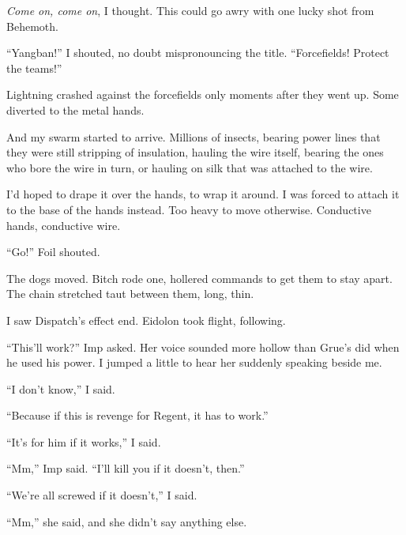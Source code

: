 \emph{Come on, come on}, I thought.  This could go awry with one lucky shot from Behemoth.



``Yangban!'' I shouted, no doubt mispronouncing the title.  ``Forcefields!  Protect the teams!''



Lightning crashed against the forcefields only moments after they went up.  Some diverted to the metal hands.



And my swarm started to arrive.  Millions of insects, bearing power lines that they were still stripping of insulation, hauling the wire itself, bearing the ones who bore the wire in turn, or hauling on silk that was attached to the wire.



I'd hoped to drape it over the hands, to wrap it around.  I was forced to attach it to the base of the hands instead.  Too heavy to move otherwise.  Conductive hands, conductive wire.



``Go!'' Foil shouted.



The dogs moved.  Bitch rode one, hollered commands to get them to stay apart.  The chain stretched taut between them, long, thin.



I saw Dispatch's effect end.  Eidolon took flight, following.



``This'll work?'' Imp asked.  Her voice sounded more hollow than Grue's did when he used his power.  I jumped a little to hear her suddenly speaking beside me.



``I don't know,'' I said.



``Because if this is revenge for Regent, it has to work.''



``It's for him if it works,'' I said.



``Mm,'' Imp said.  ``I'll kill you if it doesn't, then.''



``We're all screwed if it doesn't,'' I said.



``Mm,'' she said, and she didn't say anything else.




